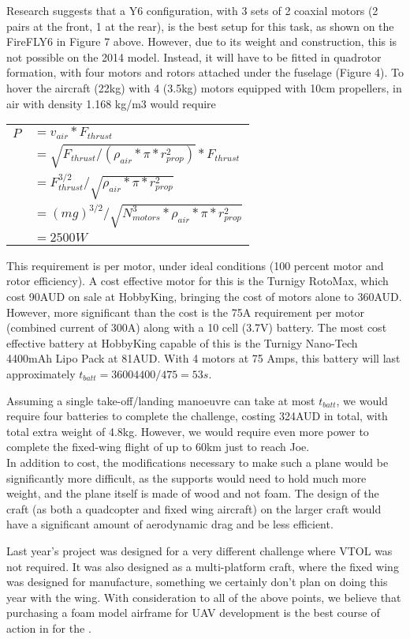 \label{app:lastYear}
Research suggests that a Y6 configuration, with 3 sets of 2 coaxial motors (2 pairs at the front, 1 at the rear), is the best setup for this task, as shown on the FireFLY6 in Figure 7 above. However, due to its weight and construction, this is not possible on the 2014 model. Instead, it will have to be fitted in quadrotor formation, with four motors and rotors attached under the fuselage (Figure 4). To hover the aircraft (22kg) with 4 (3.5kg) motors equipped with 10cm propellers, in air with density 1.168 kg/m3 would require\\

\begin{tabular}{r l}
	$P$ & $ = v_{air}*F_{thrust}$\\
		& $ = \sqrt{F_{thrust}/(\rho_{air}*\pi*r_{prop}^2)}*F_{thrust}$\\
	    & $ = F_{thrust}^{3/2}/\sqrt{\rho_{air}*\pi*r_{prop}^2}$\\
	    & $ = (mg)^{3/2}/\sqrt{N_{motors}^3*\rho_{air}*\pi*r_{prop}^2}$\\
	    & $ = 2500W$\\
\end{tabular}
\vspace{6pt}

This requirement is per motor, under ideal conditions (100 percent motor and rotor efficiency). A cost effective motor for this is the Turnigy RotoMax, which cost 90AUD on sale at HobbyKing, bringing the cost of motors alone to 360AUD. However, more significant than the cost is the 75A requirement per motor (combined current of 300A) along with a 10 cell (3.7V) battery.  The most cost effective battery at HobbyKing capable of this is the Turnigy Nano-Tech 4400mAh Lipo Pack at 81AUD. \color{red} With 4 motors at 75 Amps, this battery will last approximately $t_{batt}=36004400/475=53s$. \color{black}\\

Assuming a single take-off/landing manoeuvre can take at most $t_{batt}$, we would require four batteries to complete the challenge, costing 324AUD in total, with total extra weight of 4.8kg. However, we would require even more power to complete the fixed-wing flight of up to 60km just to reach Joe.\\

In addition to cost, the modifications necessary to make such a plane would be significantly more difficult, as the supports would need to hold much more weight, and the plane itself is made of wood and not foam. \color{red} The design of the craft (as both a quadcopter and fixed wing aircraft) on the larger craft would have a significant amount of aerodynamic drag and be less efficient. \color{black}\\

Last year's project was designed for a very different challenge where VTOL was not required. It was also designed as a multi-platform craft, where the fixed wing was designed for manufacture, something we certainly don't plan on doing this year with the wing. With consideration to all of the above points, we believe that purchasing a foam model airframe for UAV development is the best course of action in for the \ID.